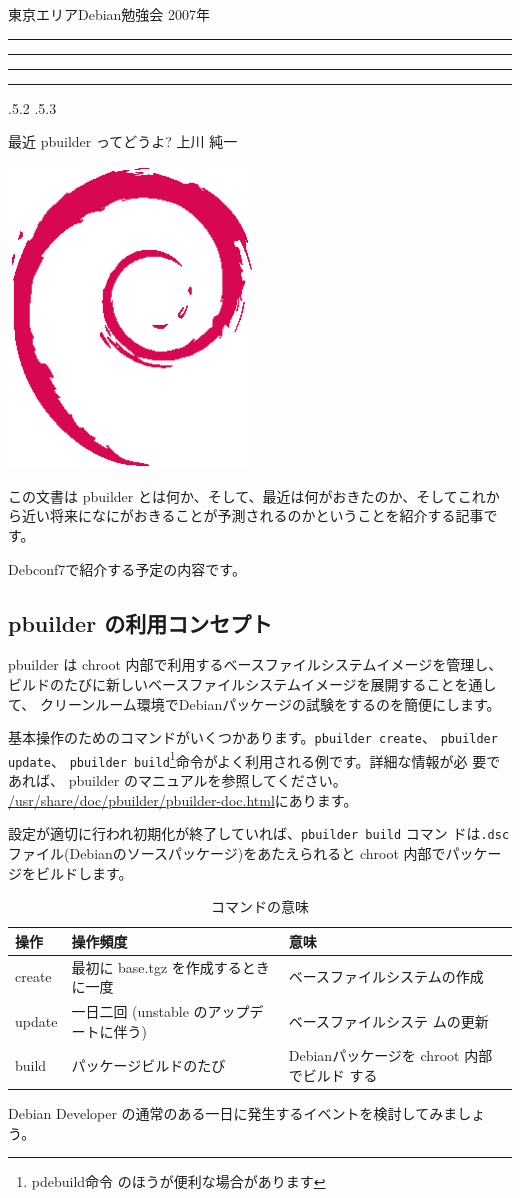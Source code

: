 \documentclass[mingoth,a4paper]{jsarticle}
\makeatletter
\newcommand{\debmtgyear}{2007}
\renewcommand{\section}{\@startsection{section}{1}{\z@}%
    {\Cvs \@plus.5\Cdp \@minus.2\Cdp}%
    {.5\Cvs \@plus.3\Cdp}%
    {\normalfont\Huge\headfont\raggedright\centering}} %
\newcommand{\dancersection}[2]{%
\newpage
東京エリアDebian勉強会 \debmtgyear{}年
\hrule
\vspace{0.5mm}
\hrule
%
\vspace{4cm}
\hrule
\vspace{0.5mm}
\hrule
%
\vspace{-7cm}
\begin{minipage}[b]{0.7\hsize}
\section{#1}
\hfill{}#2\\
\vspace{2cm}
\end{minipage}
\begin{minipage}[b]{0.3\hsize}
\hfill{}\includegraphics[height=8cm]{image200502/openlogo-nd.eps}\\
\end{minipage}
%
\vspace{-1cm}
}
\makeatother
\begin{document}
\dancersection{最近 pbuilder ってどうよ?}{上川 純一}

この文書は pbuilder とは何か、そして、最近は何がおきたのか、そしてこれか
ら近い将来になにがおきることが予測されるのかということを紹介する記事です。

Debconf7で紹介する予定の内容です。

\subsection{pbuilder の利用コンセプト}

pbuilder は chroot 内部で利用するベースファイルシステムイメージを管理し、
ビルドのたびに新しいベースファイルシステムイメージを展開することを通して、
クリーンルーム環境でDebianパッケージの試験をするのを簡便にします。

基本操作のためのコマンドがいくつかあります。\texttt{pbuilder create}、 
\texttt{pbuilder update}、 \texttt{pbuilder build}\footnote{pdebuild命令
のほうが便利な場合があります}命令がよく利用される例です。詳細な情報が必
要であれば、 pbuilder のマニュアルを参照してください。
\url{/usr/share/doc/pbuilder/pbuilder-doc.html}にあります。

設定が適切に行われ初期化が終了していれば、\texttt{pbuilder build} コマン
ドは\texttt{.dsc} ファイル(Debianのソースパッケージ)をあたえられると 
chroot 内部でパッケージをビルドします。

\begin{table}[h]
\caption{コマンドの意味}
 \begin{tabular}{|l|l|l|}
 \hline
 操作 & 操作頻度 & 意味 \\
 \hline
 create & 最初に base.tgz を作成するときに一度 & ベースファイルシステムの作成 \\
 update & 一日二回 (unstable のアップデートに伴う) & ベースファイルシステ
 ムの更新 \\
 build & パッケージビルドのたび & Debianパッケージを chroot 内部でビルド
 する \\
 \hline
 \end{tabular}
\end{table}

Debian Developer の通常のある一日に発生するイベントを検討してみましょう。
\end{document}
